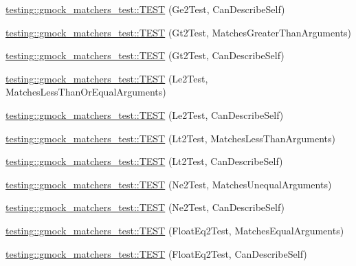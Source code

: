 \begin{DoxyCompactItemize}
\item 
\mbox{\hyperlink{namespacetesting_1_1gmock__matchers__test_aaee5baf487e6234d1d8b6779b70a15c0}{testing\+::gmock\+\_\+matchers\+\_\+test\+::\+T\+E\+ST}} (Ge2\+Test, Can\+Describe\+Self)
\item 
\mbox{\hyperlink{namespacetesting_1_1gmock__matchers__test_a4ef0cb0e88b7801075798649189d7b72}{testing\+::gmock\+\_\+matchers\+\_\+test\+::\+T\+E\+ST}} (Gt2\+Test, Matches\+Greater\+Than\+Arguments)
\item 
\mbox{\hyperlink{namespacetesting_1_1gmock__matchers__test_ae7351eb01d03897324b2fe03045f2c10}{testing\+::gmock\+\_\+matchers\+\_\+test\+::\+T\+E\+ST}} (Gt2\+Test, Can\+Describe\+Self)
\item 
\mbox{\hyperlink{namespacetesting_1_1gmock__matchers__test_add304ba60989990fc78a616c9592a948}{testing\+::gmock\+\_\+matchers\+\_\+test\+::\+T\+E\+ST}} (Le2\+Test, Matches\+Less\+Than\+Or\+Equal\+Arguments)
\item 
\mbox{\hyperlink{namespacetesting_1_1gmock__matchers__test_a75d0bbfa66d404aa458f0739297c9edc}{testing\+::gmock\+\_\+matchers\+\_\+test\+::\+T\+E\+ST}} (Le2\+Test, Can\+Describe\+Self)
\item 
\mbox{\hyperlink{namespacetesting_1_1gmock__matchers__test_ac7ecdd71d0cc49438f7ad1863fdfab05}{testing\+::gmock\+\_\+matchers\+\_\+test\+::\+T\+E\+ST}} (Lt2\+Test, Matches\+Less\+Than\+Arguments)
\item 
\mbox{\hyperlink{namespacetesting_1_1gmock__matchers__test_a9f557c4688b2907704650cc18cfd9dcf}{testing\+::gmock\+\_\+matchers\+\_\+test\+::\+T\+E\+ST}} (Lt2\+Test, Can\+Describe\+Self)
\item 
\mbox{\hyperlink{namespacetesting_1_1gmock__matchers__test_a69692057d2825f6fc8a37265667867c7}{testing\+::gmock\+\_\+matchers\+\_\+test\+::\+T\+E\+ST}} (Ne2\+Test, Matches\+Unequal\+Arguments)
\item 
\mbox{\hyperlink{namespacetesting_1_1gmock__matchers__test_acedf2eda13385067ee70bdb7d6073427}{testing\+::gmock\+\_\+matchers\+\_\+test\+::\+T\+E\+ST}} (Ne2\+Test, Can\+Describe\+Self)
\item 
\mbox{\hyperlink{namespacetesting_1_1gmock__matchers__test_a8c6f403990cc0fccf8450efee1c15002}{testing\+::gmock\+\_\+matchers\+\_\+test\+::\+T\+E\+ST}} (Float\+Eq2\+Test, Matches\+Equal\+Arguments)
\item 
\mbox{\hyperlink{namespacetesting_1_1gmock__matchers__test_ad19d6e110e85c3e7883d07f50a4b2708}{testing\+::gmock\+\_\+matchers\+\_\+test\+::\+T\+E\+ST}} (Float\+Eq2\+Test, Can\+Describe\+Self)

\end{DoxyCompactItemize}
